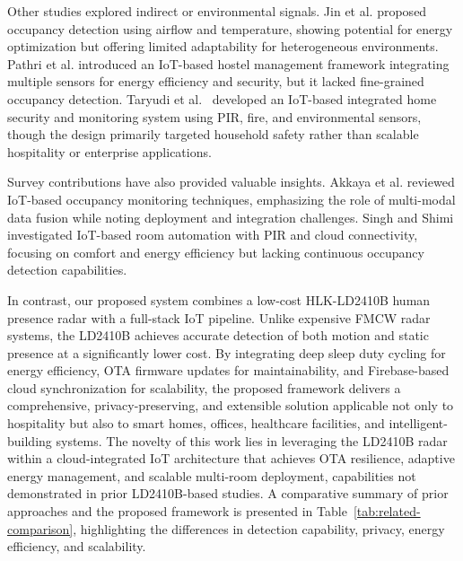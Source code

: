 \documentclass[conference]{IEEEtran}
\begin{document}
Other studies explored indirect or environmental signals. Jin et al.\cite{jin2018env} proposed occupancy detection using airflow and temperature, showing potential for energy optimization but offering limited adaptability for heterogeneous environments. Pathri et al.\cite{pathri2024hostel} introduced an IoT-based hostel management framework integrating multiple sensors for energy efficiency and security, but it lacked fine-grained occupancy detection. Taryudi et al.~\cite{taryudi2018iot} developed an IoT-based integrated home security and monitoring system using PIR, fire, and environmental sensors, though the design primarily targeted household safety rather than scalable hospitality or enterprise applications.  

Survey contributions have also provided valuable insights. Akkaya et al.\cite{akkaya2015survey} reviewed IoT-based occupancy monitoring techniques, emphasizing the role of multi-modal data fusion while noting deployment and integration challenges. Singh and Shimi\cite{singh2018room} investigated IoT-based room automation with PIR and cloud connectivity, focusing on comfort and energy efficiency but lacking continuous occupancy detection capabilities.  

In contrast, our proposed system combines a low-cost HLK-LD2410B human presence radar with a full-stack IoT pipeline. Unlike expensive FMCW radar systems, the LD2410B achieves accurate detection of both motion and static presence at a significantly lower cost. By integrating deep sleep duty cycling for energy efficiency, OTA firmware updates for maintainability, and Firebase-based cloud synchronization for scalability, the proposed framework delivers a comprehensive, privacy-preserving, and extensible solution applicable not only to hospitality but also to smart homes, offices, healthcare facilities, and intelligent-building systems. The novelty of this work lies in leveraging the LD2410B radar within a cloud-integrated IoT architecture that achieves OTA resilience, adaptive energy management, and scalable multi-room deployment, capabilities not demonstrated in prior LD2410B-based studies. A comparative summary of prior approaches and the proposed framework is presented in Table~\ref{tab:related-comparison}, highlighting the differences in detection capability, privacy, energy efficiency, and scalability.


\end{document}
